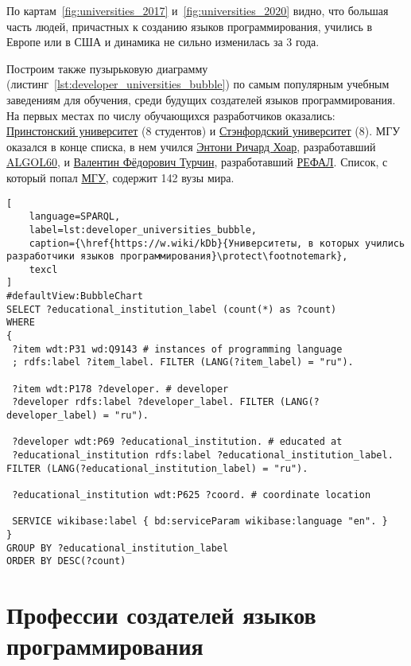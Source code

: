 По картам~\ref{fig:universities_2017} и~\ref{fig:universities_2020} видно, что большая часть людей, причастных к созданию языков программирования, учились в Европе или в США и динамика не сильно изменилась за 3 года.

Построим также пузырьковую диаграмму (листинг~\ref{lst:developer_universities_bubble}) по самым популярным учебным заведениям для обучения, среди будущих создателей языков программирования. На первых местах по числу обучающихся разработчиков оказались: \href{https://www.wikidata.org/wiki/Q21578}{Принстонский университет} (8 студентов) и \href{https://www.wikidata.org/wiki/Q41506}{Стэнфордский университет} (8). МГУ оказался в конце списка, в нем учился \href{https://www.wikidata.org/wiki/Q92602}{Энтони Ричард Хоар}, разработавший \href{https://www.wikidata.org/wiki/Q188436}{ALGOL60}, и \href{https://www.wikidata.org/wiki/Q4466506}{Валентин Фёдорович Турчин}, разработавший \href{https://www.wikidata.org/wiki/Q2626418}{РЕФАЛ}. Список, с который попал \href{https://www.wikidata.org/wiki/Q13164}{МГУ}, содержит 142 вузы мира.

\begin{lstlisting}[
	language=SPARQL,
	label=lst:developer_universities_bubble,
	caption={\href{https://w.wiki/kDb}{Университеты, в которых учились разработчики языков программирования}\protect\footnotemark},
	texcl
]
#defaultView:BubbleChart
SELECT ?educational_institution_label (count(*) as ?count)
WHERE
{
 ?item wdt:P31 wd:Q9143 # instances of programming language
 ; rdfs:label ?item_label. FILTER (LANG(?item_label) = "ru"). 
 
 ?item wdt:P178 ?developer. # developer
 ?developer rdfs:label ?developer_label. FILTER (LANG(?developer_label) = "ru"). 
 	
 ?developer wdt:P69 ?educational_institution. # educated at
 ?educational_institution rdfs:label ?educational_institution_label. FILTER (LANG(?educational_institution_label) = "ru").
 
 ?educational_institution wdt:P625 ?coord. # coordinate location
 
 SERVICE wikibase:label { bd:serviceParam wikibase:language "en". } 	
}
GROUP BY ?educational_institution_label
ORDER BY DESC(?count)
\end{lstlisting}

\section{Профессии создателей языков программирования}

